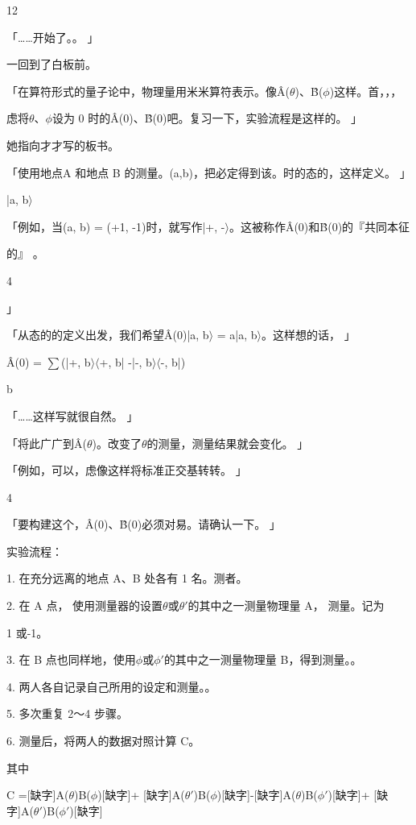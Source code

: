 12\par
「……开始了。。 」\par
一回到了白板前。\par
「在算符形式的量子论中，物理量用米米算符表示。像Â($\theta$)、B̂($\phi$)这样。首，，，\par
虑将$\theta$、$\phi$设为 0 时的Â(0)、B̂(0)吧。复习一下，实验流程是这样的。 」\par
她指向才才写的板书。\par
「使用地点A 和地点 B 的测量。(a,b)，把必定得到该。时的态的，这样定义。 」\par
|a, b$\rangle$\par
「例如，当(a, b) = (+1, -1)时，就写作|+, -$\rangle$。这被称作Â(0)和B̂(0)的『共同本征\par
的』 。\par
4\par
」\par
「从态的的定义出发，我们希望Â(0)|a, b$\rangle$ = a|a, b$\rangle$。这样想的话， 」\par
Â(0) = $\sum$(|+, b$\rangle$$\langle$+, b| -|-, b$\rangle$$\langle$-, b|)\par
b\par
「……这样写就很自然。 」\par
「将此广广到Â($\theta$)。改变了$\theta$的测量，测量结果就会变化。 」\par
「例如，可以，虑像这样将标准正交基转转。 」\par
4\par
「要构建这个，Â(0)、B̂(0)必须对易。请确认一下。 」\par
实验流程：\par
1. 在充分远离的地点 A、B 处各有 1 名。测者。\par
2. 在 A 点， 使用测量器的设置$\theta$或$\theta$$\prime$的其中之一测量物理量 A， 测量。记为\par
1 或-1。\par
3. 在 B 点也同样地，使用$\phi$或$\phi$$\prime$的其中之一测量物理量 B，得到测量。。\par
4. 两人各自记录自己所用的设定和测量。。\par
5. 多次重复 2～4 步骤。\par
6. 测量后，将两人的数据对照计算 C。\par
其中\par
C =[缺字]A($\theta$)B($\phi$)[缺字]+ [缺字]A($\theta$$\prime$)B($\phi$)[缺字]-[缺字]A($\theta$)B($\phi$$\prime$)[缺字]+ [缺字]A($\theta$$\prime$)B($\phi$$\prime$)[缺字]\par

